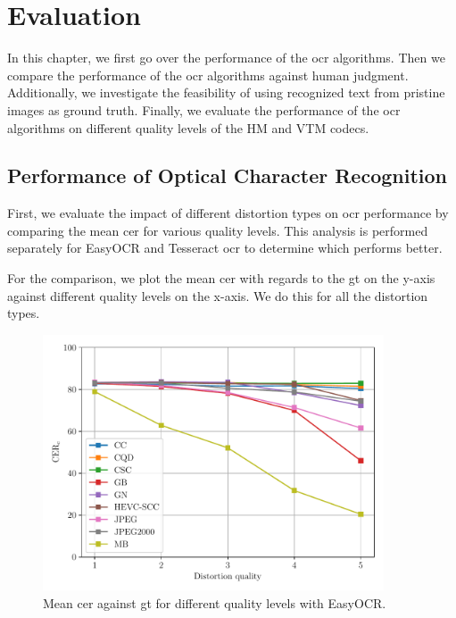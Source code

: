 \chapter{Evaluation}
\label{chap:evaluation}

In this chapter, we first go over the performance of the \gls{ocr} algorithms.
Then we compare the performance of the \gls{ocr} algorithms against human judgment.
Additionally, we investigate the feasibility of using recognized text from pristine images as ground truth.
Finally, we evaluate the performance of the \gls{ocr} algorithms on different quality levels of the HM and VTM codecs.

\section{Performance of Optical Character Recognition}
\label{sec:ocr_performance}

First, we evaluate the impact of different distortion types on \gls{ocr} performance by comparing the mean \gls{cer} for various quality levels.
This analysis is performed separately for EasyOCR and Tesseract \gls{ocr} to determine which performs better.

For the comparison, we plot the mean \gls{cer} with regards to the \gls{gt} on the y-axis against different quality levels on the x-axis.
We do this for all the distortion types.

\begin{figure}[h]
\centering
    \includegraphics[width=0.9\textwidth]{../../images/analyze/cer_dist_quality_gt_ezocr.pdf}
    \caption{Mean \gls{cer} against \gls{gt} for different quality levels with EasyOCR.}
\label{fig:cer_dist_quality_gt_ezocr}
\end{figure}

